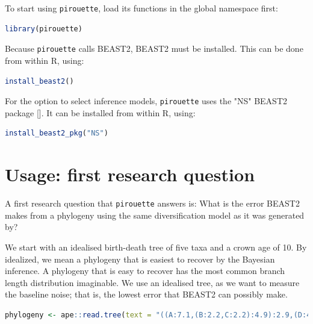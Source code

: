 \documentclass{article}
\begin{document}
To start using \verb;pirouette;, load its functions in the global namespace first:

\begin{lstlisting}[language=R, floatplacement=H, frame=single]
library(pirouette)
\end{lstlisting}
Because \verb;pirouette; calls BEAST2, BEAST2 must be installed. 
This can be done from within R, using:

\begin{lstlisting}[language=R, floatplacement=H, frame=single]
install_beast2()
\end{lstlisting}
For the option to select inference models,
\verb;pirouette; uses the "NS" BEAST2 package [\cite{maturana2018model}].
It can be installed from within R, using:

\begin{lstlisting}[language=R, floatplacement=H, frame=single]
install_beast2_pkg("NS")
\end{lstlisting}

\section{Usage: first research question}

A first research question that \verb;pirouette; answers is:
What is the error BEAST2 makes from a phylogeny using the same 
diversification model as it was generated by?

We start with an idealised 
birth-death tree of five taxa and a crown age of 10.
By idealized, we mean a phylogeny that is easiest to recover
by the Bayesian inference. A phylogeny that is easy to recover has
the most common branch length distribution imaginable. We
use an idealised tree, as we want to measure the baseline noise; that is,
the lowest error that BEAST2 can possibly make.

\begin{lstlisting}[language=R, floatplacement=H, frame=single]
phylogeny <- ape::read.tree(text = "((A:7.1,(B:2.2,C:2.2):4.9):2.9,(D:4.6,E:4.6):5.4):0;")
\end{lstlisting}
\end{document}
